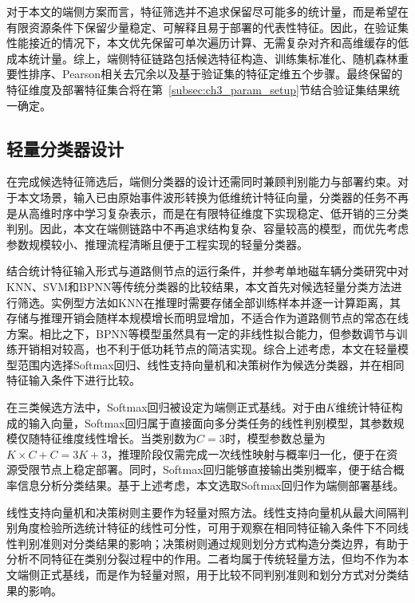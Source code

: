 \documentclass{xdupgthesis}
\begin{document}
对于本文的端侧方案而言，特征筛选并不追求保留尽可能多的统计量，而是希望在有限资源条件下保留少量稳定、可解释且易于部署的代表性特征。因此，在验证集性能接近的情况下，本文优先保留可单次遍历计算、无需复杂对齐和高维缓存的低成本统计量。综上，端侧特征链路包括候选特征构造、训练集标准化、随机森林重要性排序、Pearson相关去冗余以及基于验证集的特征定维五个步骤。最终保留的特征维度及部署特征集合将在第~\ref{subsec:ch3_param_setup}节结合验证集结果统一确定。


\subsection{轻量分类器设计}
\label{subsec:ch3_edge_cls}

在完成候选特征筛选后，端侧分类器的设计还需同时兼顾判别能力与部署约束。对于本文场景，输入已由原始事件波形转换为低维统计特征向量，分类器的任务不再是从高维时序中学习复杂表示，而是在有限特征维度下实现稳定、低开销的三分类判别。因此，本文在端侧链路中不再追求结构复杂、容量较高的模型，而优先考虑参数规模较小、推理流程清晰且便于工程实现的轻量分类器。

结合统计特征输入形式与道路侧节点的运行条件，并参考单地磁车辆分类研究中对KNN、SVM和BPNN等传统分类器的比较结果\cite{ch3_xu2018imbalanced}，本文首先对候选轻量分类方法进行筛选。实例型方法如KNN在推理时需要存储全部训练样本并逐一计算距离，其存储与推理开销会随样本规模增长而明显增加，不适合作为道路侧节点的常态在线方案。相比之下，BPNN等模型虽然具有一定的非线性拟合能力，但参数调节与训练开销相对较高，也不利于低功耗节点的简洁实现。综合上述考虑，本文在轻量模型范围内选择Softmax回归、线性支持向量机和决策树作为候选分类器，并在相同特征输入条件下进行比较。

在三类候选方法中，Softmax回归被设定为端侧正式基线。对于由$K$维统计特征构成的输入向量，Softmax回归属于直接面向多分类任务的线性判别模型，其参数规模仅随特征维度线性增长。当类别数为$C=3$时，模型参数总量为$K\times C+C=3K+3$，推理阶段仅需完成一次线性映射与概率归一化，便于在资源受限节点上稳定部署。同时，Softmax回归能够直接输出类别概率，便于结合概率信息分析分类结果。基于上述考虑，本文选取Softmax回归作为端侧部署基线。

线性支持向量机和决策树则主要作为轻量对照方法。线性支持向量机从最大间隔判别角度检验所选统计特征的线性可分性，可用于观察在相同特征输入条件下不同线性判别准则对分类结果的影响；决策树则通过规则划分方式构造分类边界，有助于分析不同特征在类别分裂过程中的作用。二者均属于传统轻量方法，但均不作为本文端侧正式基线，而是作为轻量对照，用于比较不同判别准则和划分方式对分类结果的影响。
\end{document}
